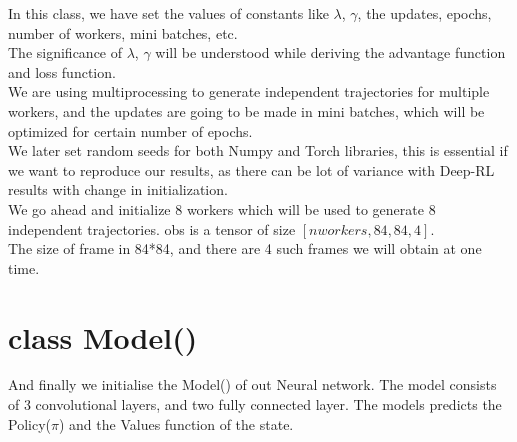 \documentclass[12pt]{extarticle}
\begin{document}
In this class, we have set the values of constants like $\lambda$, $\gamma$, the updates, epochs, number of workers, mini batches, etc. \\
The significance of  $\lambda$, $\gamma$ will be understood while deriving the advantage function and loss function. \\
We are using multiprocessing to generate independent trajectories for multiple workers, and the updates are going to be made in mini batches, which will be optimized for certain number of epochs. \\
We later set random seeds for both Numpy and Torch libraries, this is essential if we want to reproduce our results, as there can be lot of variance with Deep-RL results with change in initialization. \\
\newline
We go ahead and initialize 8 workers which will be used to generate 8 independent trajectories. 
obs is a tensor of size $[nworkers, 84, 84, 4]$. \\
The size of frame in 84*84, and there are 4 such frames we will obtain at one time. \\

\section{class Model()}
And finally we initialise the Model() of out Neural network. 
The model consists of 3 convolutional layers, and two fully connected layer. 
The models predicts the Policy($\pi$) and the Values function of the state. 
\end{document}
